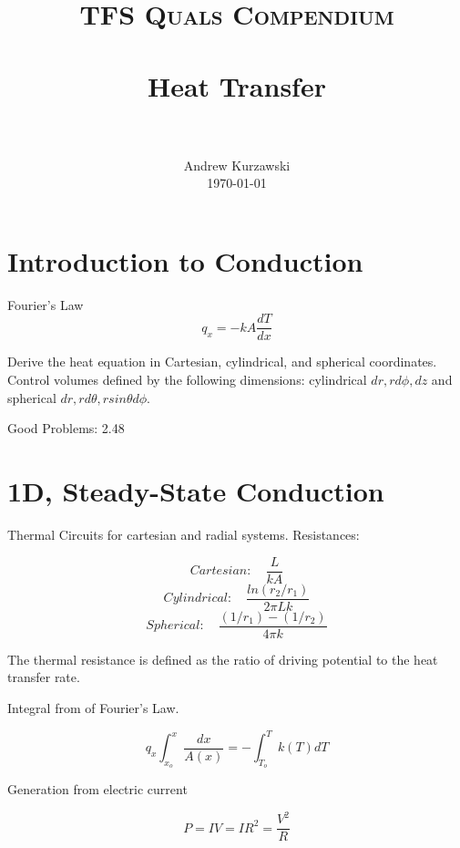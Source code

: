 \documentclass[paper=letter, fontsize=11pt]{scrartcl}
\title{
        \usefont{OT1}{bch}{b}{n}
        \normalfont \normalsize \textsc{TFS Quals Compendium} \\ [25pt]
        \horrule{0.5pt} \\[0.4cm]
        \huge Heat Transfer \\
        \horrule{2pt} \\[0.5cm]
}
\author{
        \normalfont                                 \normalsize
        Andrew Kurzawski\\[-3pt]      \normalsize
        \today
}
\date{}
\numberwithin{equation}{section}        %
\numberwithin{figure}{section}          %
\numberwithin{table}{section}               %
\begin{document}
\maketitle


\section{Introduction to Conduction}

Fourier's Law 
\begin{equation}
q_x = -kA\frac{dT}{dx}
\end{equation}

Derive the heat equation in Cartesian, cylindrical, and spherical coordinates. Control volumes defined by the following dimensions: cylindrical $dr, rd\phi, dz$ and spherical $dr, rd\theta, rsin\theta d\phi$.

\bigskip Good Problems: 2.48


\section{1D, Steady-State Conduction}

Thermal Circuits for cartesian and radial systems. Resistances:

\begin{equation}
Cartesian:\quad \frac{L}{kA}
\end{equation}
\begin{equation}
Cylindrical:\quad \frac{ln(r_2/r_1)}{2\pi Lk}
\end{equation}
\begin{equation}
Spherical:\quad \frac{(1/r_1)-(1/r_2)}{4\pi k}
\end{equation}

The thermal resistance is defined as the ratio of driving potential to the heat transfer rate.

Integral from of Fourier's Law.

\begin{equation}
q_x\int_{x_o}^x \frac{dx}{A(x)} = -\int_{T_o}^T k(T)dT
\end{equation}

Generation from electric current

\begin{equation}
P = IV = IR^2 = \frac{V^2}{R}
\end{equation}
\end{document}
